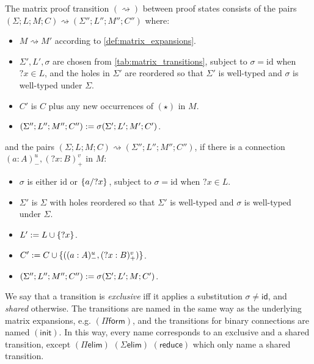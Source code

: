 \documentclass[twoside]{report}
\begin{document}
\begin{definition}
\label{def:matrix_transitions}
The matrix proof transition $(\rightsquigarrow)$ between proof states consists of the pairs $(\Sigma; L; M; C) \rightsquigarrow (\Sigma''; L''; M''; C'')$ where:
\begin{itemize}[noitemsep]
    \item $M \rightsquigarrow M'$ according to \cref{def:matrix_expansions}.
    \item $\Sigma', L', \sigma$ are chosen from \cref{tab:matrix_transitions}, subject to $\sigma = \mathrm{id}$ when ${?x} \in L$, and the holes in $\Sigma'$ are reordered so that $\Sigma'$ is well-typed and $\sigma$ is well-typed under $\Sigma$.
    \item $C'$ is $C$ plus any new occurrences of $(\star)$ in $M$.
    \item $(\Sigma''; L''; M''; C'') \defeq \sigma (\Sigma'; L'; M'; C')$.
\end{itemize}
and the pairs $(\Sigma; L; M; C) \rightsquigarrow (\Sigma''; L''; M''; C'')$, if there is a connection $(a : A)^u_-, ({?x} : B)^v_+$ in $M$:
\begin{itemize}[noitemsep]
    \item $\sigma$ is either $\mathrm{id}$ or $\subst {?x} {a} {}$, subject to $\sigma = \mathrm{id}$ when ${?x} \in L$.
    \item $\Sigma'$ is $\Sigma$ with holes reordered so that $\Sigma'$ is well-typed and $\sigma$ is well-typed under $\Sigma$.
    \item $L' \defeq L \cup \{?x\}$.
    \item $C' \defeq C \cup \{((a : A)^u_-, ({?x} : B)^v_+)\}$.
    \item $(\Sigma''; L''; M''; C'') \defeq \sigma (\Sigma'; L'; M; C')$.
\end{itemize}
We say that a transition is \emph{exclusive} iff it applies a substitution $\sigma \neq \mathsf{id}$, and \emph{shared} otherwise. The transitions are named in the same way as the underlying matrix expansions, e.g. $(\Pi\mathsf{form})$, and the transitions for binary connections are named $(\mathsf{init})$. In this way, every name corresponds to an exclusive and a shared transition, except $(\Pi\mathsf{elim})$ $(\Sigma\mathsf{elim})$ $(\mathsf{reduce})$ which only name a shared transition.
\end{definition}
\end{document}
